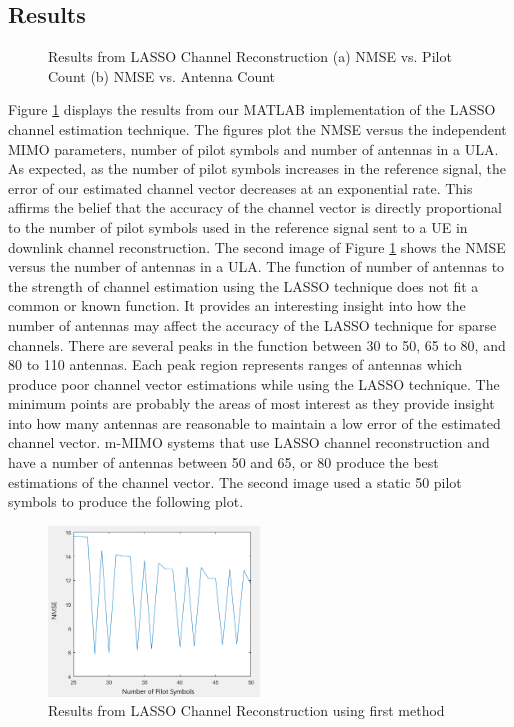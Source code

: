 \subsection{Results}
\begin{figure}[H]
    \caption{Results from LASSO Channel Reconstruction (a) NMSE vs. Pilot Count (b) NMSE vs. Antenna Count}
    \label{fig:lasso}
\end{figure}

Figure \ref{fig:lasso} displays the results from our MATLAB implementation of the LASSO channel estimation technique. The figures plot the NMSE versus the independent MIMO parameters, number of pilot symbols and number of antennas in a ULA. As expected, as the number of pilot symbols increases in the reference signal, the error of our estimated channel vector decreases at an exponential rate. This affirms the belief that the accuracy of the channel vector is directly proportional to the number of pilot symbols used in the reference signal sent to a UE in downlink channel reconstruction. The second image of Figure \ref{fig:lasso} shows the NMSE versus the number of antennas in a ULA. The function of number of antennas to the strength of channel estimation using the LASSO technique does not fit a common or known function. It provides an interesting insight into how the number of antennas may affect the accuracy of the LASSO technique for sparse channels. There are several peaks in the function between 30 to 50, 65 to 80, and 80 to 110 antennas. Each peak region represents ranges of antennas which produce poor channel vector estimations while using the LASSO technique. The minimum points are probably the areas of most interest as they provide insight into how many antennas are reasonable to maintain a low error of the estimated channel vector. m-MIMO systems that use LASSO channel reconstruction and have a number of antennas between 50 and 65, or 80 produce the best estimations of the channel vector. The second image used a static 50 pilot symbols to produce the following plot.

\begin{figure}[H]
\centering
\includegraphics[width=0.5\textwidth]{figures/StackEx-LASSO-absMSEvsPilotCount.PNG}
\caption{Results from LASSO Channel Reconstruction using first method}
\label{fig:lasso-wrong}
\end{figure}

